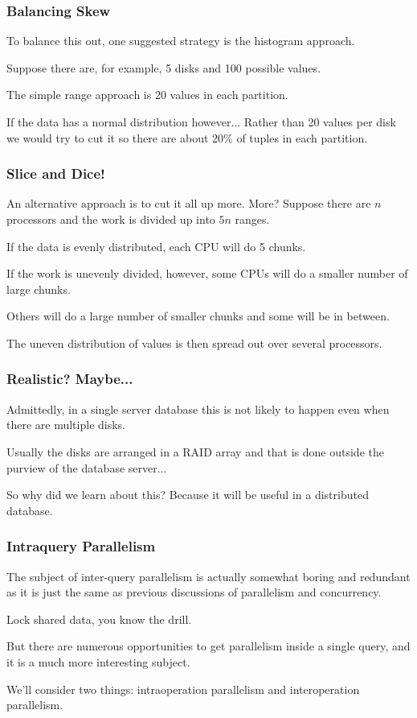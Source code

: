 \begin{frame}
\frametitle{Balancing Skew}

To balance this out, one suggested strategy is the histogram approach. 

Suppose there are, for example, 5 disks and 100 possible values. 

The simple range approach is 20 values in each partition. 

If the data has a normal distribution however... Rather than 20 values per disk we would try to cut it so there are about 20\% of tuples in each partition.

\end{frame}


\begin{frame}
\frametitle{Slice and Dice!}

An alternative approach is to cut it all up more. More? Suppose there are $n$ processors and the work is divided up into $5n$ ranges. 

If the data is evenly distributed, each CPU will do 5 chunks. 

If the work is unevenly divided, however, some CPUs will do a smaller number of large chunks.

Others will do a large number of smaller chunks and some will be in between. 

The uneven distribution of values is then spread out over several processors. 


\end{frame}

\begin{frame}
\frametitle{Realistic? Maybe...}

Admittedly, in a single server database this is not likely to happen even when there are multiple disks. 

Usually the disks are arranged in a RAID array and that is done outside the purview of the database server... 

So why did we learn about this? Because it will be useful in a distributed database.

\end{frame}


\begin{frame}
\frametitle{Intraquery Parallelism}

The subject of inter-query parallelism is actually somewhat boring and redundant as it is just the same as previous discussions of parallelism and concurrency. 

Lock shared data, you know the drill. 

But there are numerous opportunities to get parallelism inside a single query, and it is a much more interesting subject. 

We'll consider two things: intraoperation parallelism and interoperation parallelism.

\end{frame}



